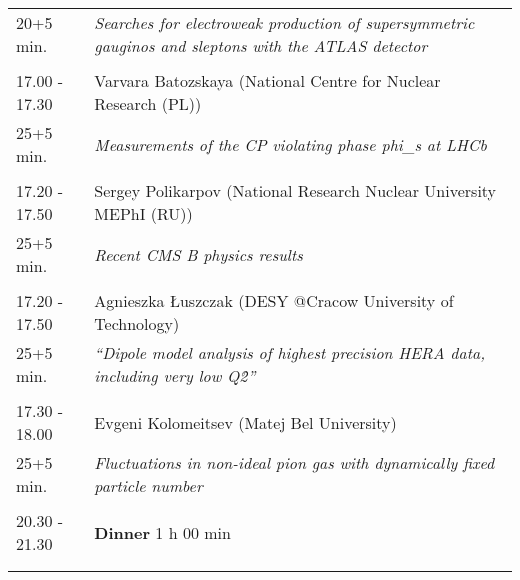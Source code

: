 \begin{longtable}{p{3cm}p{13cm}}
20+5 min. & {\it Searches for electroweak production of supersymmetric gauginos and sleptons with the ATLAS detector}\\ 
 & \\ 
17.00 - 17.30 & Varvara Batozskaya (National Centre for Nuclear Research (PL))\\ 
25+5 min. & {\it Measurements of the CP violating phase phi\_s at LHCb}\\ 
 & \\ 
17.20 - 17.50 & Sergey Polikarpov (National Research Nuclear  University MEPhI (RU))\\ 
25+5 min. & {\it Recent CMS B physics results}\\ 
 & \\ 
17.20 - 17.50 & Agnieszka Łuszczak (DESY @Cracow University of Technology)\\ 
25+5 min. & {\it “Dipole model analysis of highest precision HERA data, including very low Q\^2”}\\ 
 & \\ 
17.30 - 18.00 & Evgeni Kolomeitsev (Matej Bel University)\\ 
25+5 min. & {\it Fluctuations in non-ideal pion gas with dynamically fixed particle number}\\ 
 & \\ 
20.30 - 21.30 & {\bf Dinner} \hfill 1 h 00 min \\ 
 & \\ 
 & \\ 
\end{longtable}


